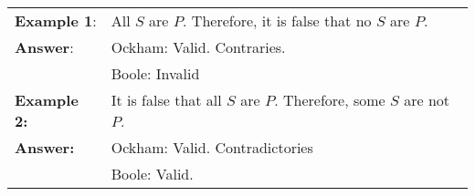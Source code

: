 \begin{longtabu}{p{.15\linewidth}p{.75\linewidth}}
\textbf{Example 1}: & All $S$ are $P$. Therefore, it is false that no $S$ are $P$.   \\
\textbf{Answer}: & Ockham: Valid. Contraries.\\ 
& Boole: Invalid \\
\textbf{Example 2:} & It is false that all $S$ are $P$. Therefore, some $S$ are not $P$.\\
\textbf{Answer:} & Ockham: Valid. Contradictories \\
& Boole: Valid.
\end{longtabu}


